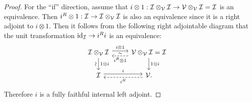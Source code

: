 \documentclass[10pt,a4paper,oneside]{article}
\begin{document}
\begin{proof}
For the ``if'' direction, assume that $i\otimes 1:\mathcal{I}\otimes_\mathcal{V}\mathcal{I} \to\mathcal{V}\otimes_\mathcal{V}\mathcal{I}=\mathcal{I}$ is an equivalence. Then $i^R\otimes 1: \mathcal{I}\to\mathcal{I}\otimes_\mathcal{V}\mathcal{I}$ is also an equivalence since it is a right adjoint to $i\otimes 1$. %
Then it follows from the following right adjointable diagram that the unit transformation $\operatorname{id}_\mathcal{I}\to i^Ri$ is an equivalence:
$$\begin{tikzcd}
\mci\otimes_\mcv\mci \arrow[d,  "1\otimes i","\rotatebox{90}{$\sim$}"'] \arrow[r,"i\otimes 1", "\sim"', shift left] & \mcv\otimes_\mcv\mci=\mci \arrow[d, "1\otimes i"] \arrow[l, "i^R\otimes 1", dashed, shift left=2] \\
\mci \arrow[r, "i", shift left]                                        & \mcv. \arrow[l, "i^R", dashed, shift left]                                               
\end{tikzcd}$$
Therefore $i$ is a fully faithful internal left adjoint.



\end{proof}
\end{document}
